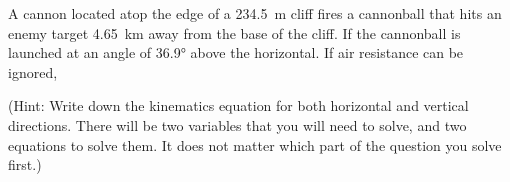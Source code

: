 \documentclass[addpoints,12pt]{exam}
\begin{document}
\begin{questions}

  \question A cannon located atop the edge of a \SI{234.5}{\metre} cliff fires
  a cannonball that hits an enemy target \SI{4.65}{\kilo\metre} away from the
  base of the cliff. If the cannonball is launched at an angle of \ang{36.9}
  above the horizontal. If air resistance can be ignored,
  (Hint: Write down the kinematics equation for both horizontal and vertical
  directions. There will be two variables that you will need to solve, and two
  equations to solve them. It does not matter which part of the question you
  solve first.)
  \newpage


\end{questions}
\end{document}
